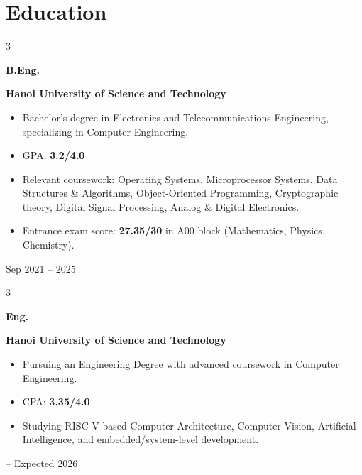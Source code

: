 \documentclass[10pt, letterpaper]{article}
\newenvironment{highlights}{
    \begin{itemize}[
        topsep=0.10 cm,
        parsep=0.10 cm,
        partopsep=0pt,
        itemsep=0pt,
        leftmargin=0.4 cm + 10pt
    ]
}{
    \end{itemize}
} %
\newenvironment{threecolentry}[3][]{
    \onecolentry
    \def\thirdColumn{#3}
    \setcolumnwidth{1 cm, \fill, 4.5 cm}
    \begin{paracol}{3}
    {\raggedright #2} \switchcolumn
}{
    \switchcolumn \raggedleft \thirdColumn
    \end{paracol}
    \endonecolentry
} %
\begin{document}
    \section{Education}
    \begin{threecolentry}
        {\textbf{B.Eng.}}
        {Sep 2021 -- 2025}
        {\textbf{Hanoi University of Science and Technology}}
        \begin{highlights}
            \item Bachelor's degree in Electronics and Telecommunications Engineering, specializing in Computer Engineering.
            \item GPA: \textbf{3.2/4.0}
            \item Relevant coursework: Operating Systems, Microprocessor Systems, Data Structures \& Algorithms, Object-Oriented Programming, Cryptographic theory, Digital Signal Processing, Analog \& Digital Electronics.
            \item Entrance exam score: \textbf{27.35/30} in A00 block (Mathematics, Physics, Chemistry).
        \end{highlights}
    \end{threecolentry}
    \vspace{0.2 cm}
    \begin{threecolentry}
        {\textbf{Eng.}}
        {2025 -- Expected 2026}
        {\textbf{Hanoi University of Science and Technology}}
        \begin{highlights}
            \item Pursuing an Engineering Degree with advanced coursework in Computer Engineering.
            \item CPA: \textbf{3.35/4.0}
            \item Studying RISC-V-based Computer Architecture, Computer Vision, Artificial Intelligence, and embedded/system-level development.
        \end{highlights}
    \end{threecolentry}

    
\end{document}
